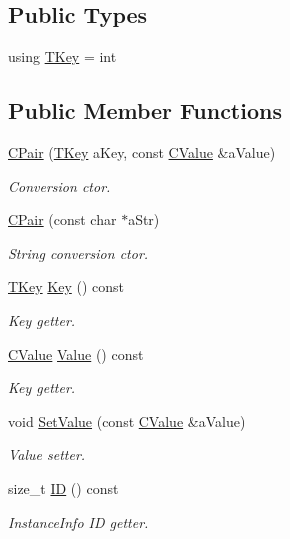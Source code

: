 \subsection*{Public Types}
\begin{DoxyCompactItemize}
\item 
using \hyperlink{class_c_pair_a9030f3ef2a07301c105bdf17620ae66a}{T\+Key} = int
\end{DoxyCompactItemize}
\subsection*{Public Member Functions}
\begin{DoxyCompactItemize}
\item 
\hyperlink{class_c_pair_a329a0eda927e7d046c0d8b7ec1f6a627}{C\+Pair} (\hyperlink{class_c_pair_a9030f3ef2a07301c105bdf17620ae66a}{T\+Key} a\+Key, const \hyperlink{class_c_value___t_student_1_1_c_value}{C\+Value} \&a\+Value)
\begin{DoxyCompactList}\small\item\em Conversion c\textquotesingle{}tor. \end{DoxyCompactList}\item 
\hyperlink{class_c_pair_a6e830f794b917d178fb50593f4ff130d}{C\+Pair} (const char $\ast$a\+Str)
\begin{DoxyCompactList}\small\item\em String conversion c\textquotesingle{}tor. \end{DoxyCompactList}\item 
\hyperlink{class_c_pair_a9030f3ef2a07301c105bdf17620ae66a}{T\+Key} \hyperlink{class_c_pair_adf7d1223204fb81086556ece353957cc}{Key} () const
\begin{DoxyCompactList}\small\item\em Key getter. \end{DoxyCompactList}\item 
\hyperlink{class_c_value___t_student_1_1_c_value}{C\+Value} \hyperlink{class_c_pair_a9309abb246169d3372c4a4355f3554ea}{Value} () const
\begin{DoxyCompactList}\small\item\em Key getter. \end{DoxyCompactList}\item 
void \hyperlink{class_c_pair_ab09ffc8f30f7ab38d638d9fab3dcc14b}{Set\+Value} (const \hyperlink{class_c_value___t_student_1_1_c_value}{C\+Value} \&a\+Value)
\begin{DoxyCompactList}\small\item\em Value setter. \end{DoxyCompactList}\item 
size\+\_\+t \hyperlink{class_c_pair_a51e4cb447c5bc9b7899f408a556592c6}{ID} () const
\begin{DoxyCompactList}\small\item\em Instance\+Info ID getter. \end{DoxyCompactList}\end{DoxyCompactItemize}
